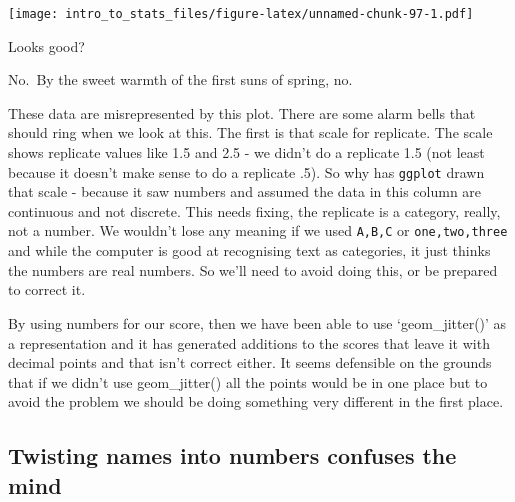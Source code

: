 \documentclass[
]{book}
\newenvironment{Shaded}{\begin{snugshade}}{\end{snugshade}}
\newcommand{\DataTypeTok}[1]{\textcolor[rgb]{0.13,0.29,0.53}{#1}}
\newcommand{\KeywordTok}[1]{\textcolor[rgb]{0.13,0.29,0.53}{\textbf{#1}}}
\newcommand{\NormalTok}[1]{#1}
\newcommand{\OperatorTok}[1]{\textcolor[rgb]{0.81,0.36,0.00}{\textbf{#1}}}
\newcommand{\StringTok}[1]{\textcolor[rgb]{0.31,0.60,0.02}{#1}}
\newenvironment{sidenote}
{ \begin{tcolorbox}[colbacktitle=blue!50!white,
title=huh?,coltitle=white,
fonttitle=\bfseries] }
{  \end{tcolorbox} }
\begin{document}
\begin{Shaded}
\end{Shaded}

\texttt{[image: intro\_to\_stats\_files/figure-latex/unnamed-chunk-97-1.pdf]}

Looks good?

No.~By the sweet warmth of the first suns of spring, no.

These data are misrepresented by this plot. There are some alarm bells that should ring when we look at this. The first is that scale for replicate. The scale shows replicate values like 1.5 and 2.5 - we didn't do a replicate 1.5 (not least because it doesn't make sense to do a replicate .5). So why has \texttt{ggplot} drawn that scale - because it saw numbers and assumed the data in this column are continuous and not discrete. This needs fixing, the replicate is a category, really, not a number. We wouldn't lose any meaning if we used \texttt{A,B,C} or \texttt{one,two,three} and while the computer is good at recognising text as categories, it just thinks the numbers are real numbers. So we'll need to avoid doing this, or be prepared to correct it.

\begin{sidenote}
By using numbers for our score, then we have been able to use `geom\_jitter()' as a representation and it has generated additions to the scores that leave it with decimal points and that isn't correct either. It seems defensible on the grounds that if we didn't use geom\_jitter() all the points would be in one place but to avoid the problem we should be doing something very different in the first place.
\end{sidenote}

\hypertarget{twisting-names-into-numbers-confuses-the-mind}{%
\subsection{Twisting names into numbers confuses the mind}\label{twisting-names-into-numbers-confuses-the-mind}}
\end{document}
